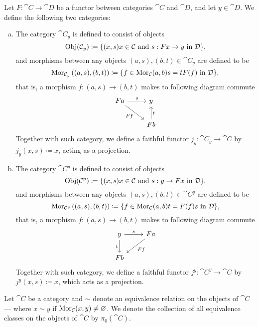\begin{definition}
Let \(F: \cat C \to \cat D\) be a functor between categories \(\cat C\) and
\(\cat D\), and let \(y \in \cat D\). We define the following two categories:
\begin{enumerate}[(a)]\setlength\itemsep{0em}
\item The category \(\cat C_y\) is defined to consist of objects
  \[
    \operatorname{Obj}(\mathcal C_y) \coloneq
    \{(x, s) \relax x \in \mathcal C \text{ and } s: F x \to y \text{ in } \mathcal D\},
  \]
  and morphisms between any objects \((a, s), (b, t) \in \cat C_{y}\) are
  defined to be
  \[
    \operatorname{Mor}_{\mathcal C_y}\left( (a, s), (b, t) \right) \coloneq
    \{f \in \operatorname{Mor}_{\mathcal C}(a, b) \relax s = t F(f) \text{ in } \mathcal D\},
  \]
  that is, a morphism \(f: (a, s) \to (b, t)\) makes to following diagram
  commute
  \[
    \begin{tikzcd}
      F a \ar[r, "s"] \ar[dr, swap, "Ff"] &y \\
      &F b \ar[u, swap, "t"]
    \end{tikzcd}
  \]
  Together with such category, we define a faithful functor \(j_y: \cat C_y \to
  \cat C\) by \(j_y(x, s) \coloneq x\), acting as a projection.
\item The category \(\cat C^y\) is defined to consist of objects
  \[
    \operatorname{Obj}(\mathcal C^y) \coloneq
    \{(x, s) \relax x \in \mathcal C \text{ and } s: y \to F x \text{ in } \mathcal D\},
  \]
  and morphisms between any objects \((a, s), (b, t) \in \cat C^{y}\) are
  defined to be
  \[
    \operatorname{Mor}_{\mathcal C^y}\left( (a, s), (b, t) \right) \coloneq
    \{f \in \operatorname{Mor}_{\mathcal C}(a, b) \relax t = F(f) s \text{ in } \mathcal D\},
  \]
  that is, a morphism \(f: (a, s) \to (b, t)\) makes to following diagram
  commute
  \[
    \begin{tikzcd}
      y \ar[r, "s"] \ar[d, swap, "t"] &Fa \ar[dl, "F f"] \\
      F b &
    \end{tikzcd}
  \]
  Together with such category, we define a faithful functor \(j^y: \cat C^y \to
  \cat C\) by \(j^y(x, s) \coloneq x\), which acts as a projection.
\end{enumerate}
\end{definition}

\begin{definition}
\label{def:equivalence-class-category}
Let \(\cat C\) be a category and \(\sim\) denote an equivalence relation on the
objects of \(\cat C\) --- where \(x \sim y\) if \(\operatorname{Mor}_{\mathcal C}(x, y) \neq
\varnothing\). We denote the collection of all equivalence classes on the objects
of \(\cat C\) by \(\pi_0(\cat C)\).
\end{definition}

